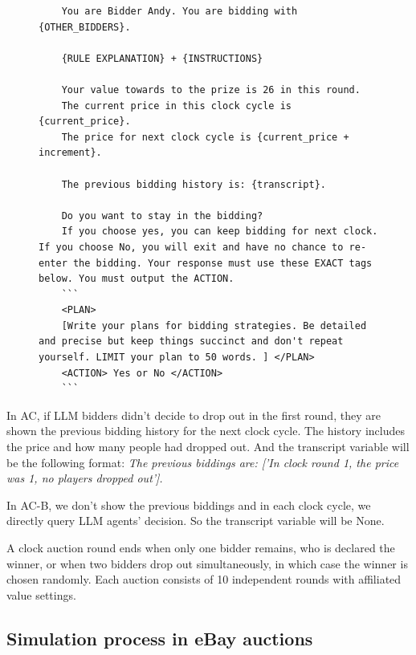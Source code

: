 \begin{figure}[H]
\centering
\begin{minipage}{0.95\textwidth}
\begin{lstlisting}
    You are Bidder Andy. You are bidding with {OTHER_BIDDERS}.     
    
    {RULE EXPLANATION} + {INSTRUCTIONS} 

    Your value towards to the prize is 26 in this round.
    The current price in this clock cycle is {current_price}. 
    The price for next clock cycle is {current_price + increment}.

    The previous bidding history is: {transcript}.

    Do you want to stay in the bidding? 
    If you choose yes, you can keep bidding for next clock. If you choose No, you will exit and have no chance to re-enter the bidding. Your response must use these EXACT tags below. You must output the ACTION.
    ```
    <PLAN>
    [Write your plans for bidding strategies. Be detailed and precise but keep things succinct and don't repeat yourself. LIMIT your plan to 50 words. ] </PLAN>
    <ACTION> Yes or No </ACTION>
    ```
\end{lstlisting}
\end{minipage}
\label{fig:ac_prompt}
\end{figure}

In AC, if LLM bidders didn't decide to drop out in the first round, they are shown the previous bidding history for the next clock cycle. The history includes the price and how many people had dropped out. 
And the transcript variable will be the following format:
\textit{    The previous biddings are: 
    ['In clock round 1, the price was 1, 
    no players dropped out'].}

In AC-B, we don't show the previous biddings and in each clock cycle, we directly query LLM agents' decision. 
So the transcript variable will be None.

A clock auction round ends when only one bidder remains, who is declared the winner, or when two bidders drop out simultaneously, in which case the winner is chosen randomly. Each auction consists of 10 independent rounds with affiliated value settings.



\subsection{Simulation process in eBay auctions}\label{app:ebay}

